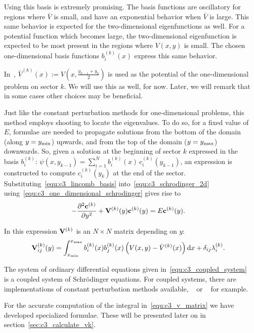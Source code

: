Using this basis is extremely promising. The basis functions are oscillatory for regions where $\bar{V}$ is small, and have an exponential behavior when $\bar{V}$ is large. This same behavior is expected for the two-dimensional eigenfunctions as well. For a potential function which becomes large, the two-dimensional eigenfunction is expected to be most present in the regions where $V(x, y)$ is small. The chosen one-dimensional basis functions $b_i^{(k)}(x)$ express this same behavior.

In~\cite{ixaru_new_2010}, $\bar{V}^{(k)}(x) := V\left(x, \frac{y_{k-1} + y_k}{2}\right)$ is used as the potential of the one-dimen\-sional problem on sector $k$. We will use this as well, for now. Later, we will remark that in some cases other choices may be beneficial.

Just like the constant perturbation methods for one-dimensional problems, this method employs shooting to locate the eigenvalues. To do so, for a fixed value of $E$, formulae are needed to propagate solutions from the bottom of the domain (along $y = {y_{\text{min}}}$) upwards, and from the top of the domain ($y = {y_{\text{max}}}$) downwards. So, given a solution at the beginning of sector $k$ expressed in the basis $b_i^{(k)}$: $ \psi(x, y_{k-1}) = \sum_{i=1}^{N} b_i^{(k)}(x)\, c_i^{(k)}(y_{k-1}) $, an expression is constructed to compute $c^{(k)}_i(y_k)$ at the end of the sector. Substituting~\eqref{equ:c3_lincomb_basis} into~\eqref{equ:c3_schrodinger_2d} using~\eqref{equ:c3_one_dimensional_schrodinger} gives rise to
\begin{equation}\label{equ:c3_coupled_system}
  -\pdv[2]{\vb{c}^{(k)}}{y} + \vb{V}^{(k)}(y) \vb{c}^{(k)}(y) = E \vb{c}^{(k)}(y) \text{.}
\end{equation}

In this expression $\vb{V}^{(k)}$ is an $N\times N$ matrix depending on $y$:
\begin{equation}\label{equ:c3_v_matrix}
  \vb{V}^{(k)}_{ij}(y) = \int_{{x_{\text{min}}}}^{{x_{\text{max}}}} b_i^{(k)}(x) b_j^{(k)}(x) \left(V(x, y) - \bar{V}^{(k)}(x)\right) \dd x + \delta_{ij} \lambda_i^{(k)} \text{.}
\end{equation}

The system of ordinary differential equations given in~\eqref{equ:c3_coupled_system} is a coupled system of Schrö\-dinger equations. For coupled systems, there are implementations of constant perturbation methods available, \lilix{}~\cite{ixaru_lilix_2002} or \matscs{}~\cite{ledoux_numerical_2007} for example.

For the accurate computation of the integral in~\eqref{equ:c3_v_matrix} we have developed specialized formulae. These will be presented later on in section~\ref{sec:c3_calculate_vk}.

